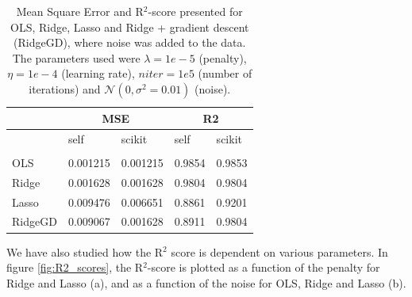 \begin{table} [H]
	\caption{Mean Square Error and R$^2$-score presented for OLS, Ridge, Lasso and Ridge + gradient descent (RidgeGD), where noise was added to the data. The parameters used were $\lambda=1e-5$ (penalty), $\eta=1e-4$ (learning rate), $niter=1e5$ (number of iterations) and $\mathcal{N}(0, \sigma^2=0.01)$ (noise). \vspace{2mm}}
	\begin{tabularx}{\textwidth}{l|XX|XX} \hline\hline
		\label{tab:franke_error}
		& \multicolumn{2}{c}{\textbf{MSE}}&\multicolumn{2}{c}{\textbf{R2}}\\ \hline
		&self&scikit&self&scikit\\ \hline \\
		OLS & 0.001215 & 0.001215 & 0.9854 & 0.9853\\
		Ridge & 0.001628 & 0.001628 & 0.9804 & 0.9804 \\
		Lasso & 0.009476 & 0.006651 & 0.8861 & 0.9201 \\
		RidgeGD & 0.009067 & 0.001628 & 0.8911 & 0.9804 \\ \hline
	\end{tabularx}
\end{table}

We have also studied how the R$^2$ score is dependent on various parameters. In figure \eqref{fig:R2_scores}, the R$^2$-score is plotted as a function of the penalty for Ridge and Lasso (a), and as a function of the noise for OLS, Ridge and Lasso (b).

